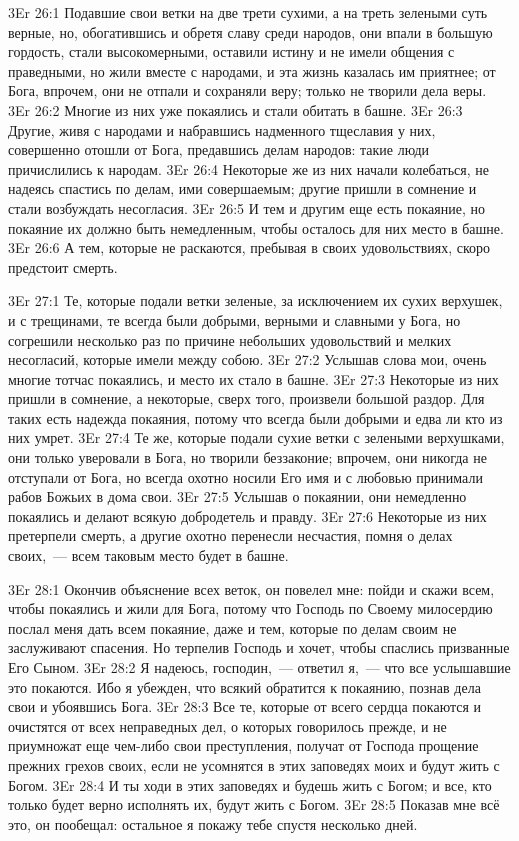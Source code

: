 \vs 3Er 26:1
Подавшие свои ветки на две
трети сухими, а на треть зелеными суть верные, но, обогатившись и обретя славу
среди народов, они впали в большую гордость, стали высокомерными, оставили
истину и не имели общения с праведными, но жили вместе с народами, и эта жизнь
казалась им приятнее; от Бога, впрочем, они не отпали и сохраняли веру; только
не творили дела веры.
\vs 3Er 26:2
Многие из них уже
покаялись и стали обитать в башне.
\vs 3Er 26:3
Другие, живя с народами и
набравшись надменного тщеславия у них, совершенно отошли от Бога, предавшись
делам народов: такие люди причислились к народам.
\vs 3Er 26:4
Некоторые же из них начали
колебаться, не надеясь спастись по делам, ими совершаемым; другие пришли в
сомнение и стали возбуждать несогласия.
\vs 3Er 26:5
И тем и другим еще есть
покаяние, но покаяние их должно быть немедленным, чтобы осталось для них место
в башне.
\vs 3Er 26:6
А тем, которые не
раскаются, пребывая в своих удовольствиях, скоро предстоит смерть.

\vs 3Er 27:1
Те, которые подали ветки
зеленые, за исключением их сухих верхушек, и с трещинами, те всегда были
добрыми, верными и славными у Бога, но согрешили несколько раз по причине
небольших удовольствий и мелких несогласий, которые имели между собою.
\vs 3Er 27:2
Услышав слова мои, очень
многие тотчас покаялись, и место их стало в башне.
\vs 3Er 27:3
Некоторые из них пришли в
сомнение, а некоторые, сверх того, произвели большой раздор. Для таких есть
надежда покаяния, потому что всегда были добрыми и едва ли кто из них умрет.
\vs 3Er 27:4
Те же, которые подали
сухие ветки с зелеными верхушками, они только уверовали в Бога, но творили
беззаконие; впрочем, они никогда не отступали от Бога, но всегда охотно носили
Его имя и с любовью принимали рабов Божьих в дома свои.
\vs 3Er 27:5
Услышав о покаянии, они
немедленно покаялись и делают всякую добродетель и правду.
\vs 3Er 27:6
Некоторые из них
претерпели смерть, а другие охотно перенесли несчастия,
помня о делах своих,~--- всем таковым место будет в башне.

\vs 3Er 28:1
Окончив объяснение всех
веток, он повелел мне: пойди и скажи всем, чтобы покаялись и жили для Бога,
потому что Господь по Своему милосердию послал меня дать всем покаяние, даже и
тем, которые по делам своим не заслуживают спасения. Но терпелив Господь и
хочет, чтобы спаслись призванные Его Сыном.
\vs 3Er 28:2
Я надеюсь, господин,~--- ответил я,~--- что все услышавшие это покаются. Ибо я убежден, что всякий
обратится к покаянию, познав дела свои и убоявшись Бога.
\vs 3Er 28:3
Все те, которые от всего
сердца покаются и очистятся от всех неправедных дел, о которых говорилось
прежде, и не приумножат еще чем-либо свои преступления, получат от Господа
прощение прежних грехов своих, если не усомнятся в этих заповедях моих и будут
жить с Богом.
\vs 3Er 28:4
И ты ходи в этих заповедях
и будешь жить с Богом; и все, кто только будет верно исполнять их, будут жить
с Богом.
\vs 3Er 28:5
Показав мне всё это, он
пообещал: остальное я покажу тебе спустя несколько дней.

